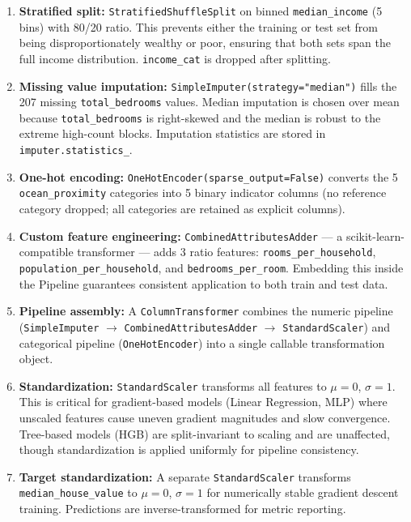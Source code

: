 \begin{enumerate}
  \item \textbf{Stratified split:} \texttt{StratifiedShuffleSplit} on binned \texttt{median\_income} (5 bins) with 80/20 ratio. This prevents either the training or test set from being disproportionately wealthy or poor, ensuring that both sets span the full income distribution. \texttt{income\_cat} is dropped after splitting.
  \item \textbf{Missing value imputation:} \texttt{SimpleImputer(strategy="median")} fills the 207 missing \texttt{total\_bedrooms} values. Median imputation is chosen over mean because \texttt{total\_bedrooms} is right-skewed and the median is robust to the extreme high-count blocks. Imputation statistics are stored in \texttt{imputer.statistics\_}.
  \item \textbf{One-hot encoding:} \texttt{OneHotEncoder(sparse\_output=False)} converts the 5 \texttt{ocean\_proximity} categories into 5 binary indicator columns (no reference category dropped; all categories are retained as explicit columns).
  \item \textbf{Custom feature engineering:} \texttt{CombinedAttributesAdder} — a scikit-learn-compatible transformer — adds 3 ratio features: \texttt{rooms\_per\_household}, \texttt{population\_per\_household}, and \texttt{bedrooms\_per\_room}. Embedding this inside the Pipeline guarantees consistent application to both train and test data.
  \item \textbf{Pipeline assembly:} A \texttt{ColumnTransformer} combines the numeric pipeline (\texttt{SimpleImputer} $\rightarrow$ \texttt{CombinedAttributesAdder} $\rightarrow$ \texttt{StandardScaler}) and categorical pipeline (\texttt{OneHotEncoder}) into a single callable transformation object.
  \item \textbf{Standardization:} \texttt{StandardScaler} transforms all features to $\mu = 0$, $\sigma = 1$. This is critical for gradient-based models (Linear Regression, MLP) where unscaled features cause uneven gradient magnitudes and slow convergence. Tree-based models (HGB) are split-invariant to scaling and are unaffected, though standardization is applied uniformly for pipeline consistency.
  \item \textbf{Target standardization:} A separate \texttt{StandardScaler} transforms \texttt{median\_house\_value} to $\mu = 0$, $\sigma = 1$ for numerically stable gradient descent training. Predictions are inverse-transformed for metric reporting.
\end{enumerate}

